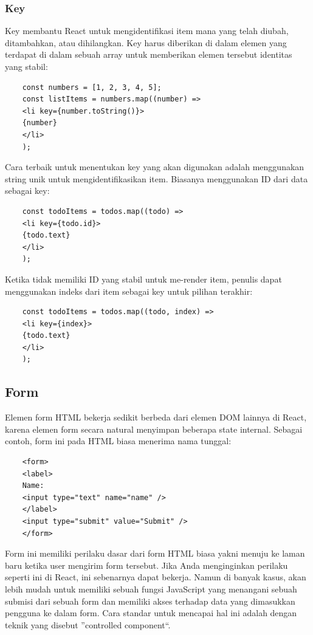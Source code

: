 \subsubsection{Key}
Key membantu React untuk mengidentifikasi item mana yang telah diubah, ditambahkan, atau dihilangkan. Key harus diberikan di dalam elemen yang terdapat di dalam sebuah array untuk memberikan elemen tersebut identitas yang stabil:
\begin{lstlisting}
	const numbers = [1, 2, 3, 4, 5];
	const listItems = numbers.map((number) =>
	<li key={number.toString()}>
	{number}
	</li>
	);
\end{lstlisting}
Cara terbaik untuk menentukan key yang akan digunakan adalah menggunakan string unik untuk mengidentifikasikan item. Biasanya menggunakan ID dari data sebagai key:
\begin{lstlisting}
	const todoItems = todos.map((todo) =>
	<li key={todo.id}>
	{todo.text}
	</li>
	);
\end{lstlisting}
Ketika tidak memiliki ID yang stabil untuk me-render item, penulis dapat menggunakan indeks dari item sebagai key untuk pilihan terakhir:
\begin{lstlisting}
	const todoItems = todos.map((todo, index) =>
	<li key={index}>
	{todo.text}
	</li>
	);
\end{lstlisting}

\subsection{Form}
Elemen form HTML bekerja sedikit berbeda dari elemen DOM lainnya di React, karena elemen form secara natural menyimpan beberapa state internal. Sebagai contoh, form ini pada HTML biasa menerima nama tunggal:
\begin{lstlisting}
	<form>
	<label>
	Name:
	<input type="text" name="name" />
	</label>
	<input type="submit" value="Submit" />
	</form>
\end{lstlisting}
Form ini memiliki perilaku dasar dari form HTML biasa yakni menuju ke laman baru ketika user mengirim form tersebut. Jika Anda menginginkan perilaku seperti ini di React, ini sebenarnya dapat bekerja. Namun di banyak kasus, akan lebih mudah untuk memiliki sebuah fungsi JavaScript yang menangani sebuah submisi dari sebuah form dan memiliki akses terhadap data yang dimasukkan pengguna ke dalam form. Cara standar untuk mencapai hal ini adalah dengan teknik yang disebut ”controlled component“.
